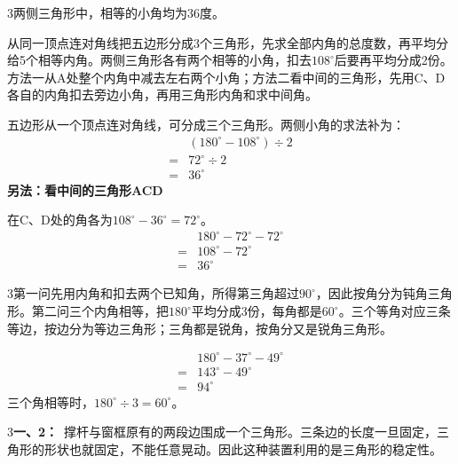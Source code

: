 \documentclass[multi=snippet,border={5bp 20bp 5bp 5bp}]{standalone}
\newenvironment{snippet}[3]{\begin{minipage}{#1bp}\color{answerred}\fontsize{#2}{#3}\selectfont\raggedright}{\end{minipage}}
\begin{document}
\begin{snippet}{505}{11.5}{14}\begin{multicols}{3}\raggedcolumns 两侧三角形中，相等的小角均为36度。\par 从同一顶点连对角线把五边形分成3个三角形，先求全部内角的总度数，再平均分给5个相等内角。两侧三角形各有两个相等的小角，扣去\(108^\circ\)\allowbreak 后要再平均分成2份。方法一从A处整个内角中减去左右两个小角；方法二看中间的三角形，先用C、D各自的内角扣去旁边小角，再用三角形内角和求中间角。\par 五边形从一个顶点连对角线，可分成三个三角形。两侧小角的求法补为：\[\begin{aligned}&(180^\circ-108^\circ)\div2\\={}&72^\circ\div2\\={}&36^\circ\end{aligned}\]\textbf{另法：看中间的三角形ACD}\par 在C、D处的角各为\(108^\circ-36^\circ=72^\circ\)\allowbreak 。\[\begin{aligned}&180^\circ-72^\circ-72^\circ\\={}&108^\circ-72^\circ\\={}&36^\circ\end{aligned}\]\end{multicols}\end{snippet}
\begin{snippet}{505}{11.5}{14}\begin{multicols}{3}\raggedcolumns 第一问先用内角和扣去两个已知角，所得第三角超过\(90^\circ\)\allowbreak ，因此按角分为钝角三角形。第二问三个内角相等，把\(180^\circ\)\allowbreak 平均分成3份，每角都是\(60^\circ\)\allowbreak 。三个等角对应三条等边，按边分为等边三角形；三角都是锐角，按角分又是锐角三角形。\par \[\begin{aligned}&180^\circ-37^\circ-49^\circ\\={}&143^\circ-49^\circ\\={}&94^\circ\end{aligned}\]三个角相等时，\(180^\circ\div3=60^\circ\)\allowbreak 。\end{multicols}\end{snippet}
\begin{snippet}{505}{11.5}{14}\begin{multicols}{3}\raggedcolumns \textbf{一、2：}\ 撑杆与窗框原有的两段边围成一个三角形。三条边的长度一旦固定，三角形的形状也就固定，不能任意晃动。因此这种装置利用的是三角形的稳定性。\end{multicols}\end{snippet}
\end{document}
